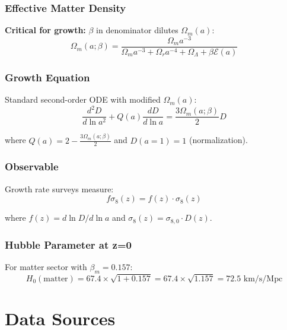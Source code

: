 \documentclass[11pt]{article}
\begin{document}
\subsubsection{Effective Matter Density}

\textbf{Critical for growth:} $\beta$ in denominator dilutes $\Omega_m(a)$:
\begin{equation}
\Omega_m(a; \beta) = \frac{\Omega_m a^{-3}}{\Omega_m a^{-3} + \Omega_r a^{-4} + \Omega_\Lambda + \beta \mathcal{E}(a)}
\end{equation}

\subsubsection{Growth Equation}

Standard second-order ODE with modified $\Omega_m(a)$:
\begin{equation}
\frac{d^2 D}{d\ln a^2} + Q(a) \frac{dD}{d\ln a} = \frac{3\Omega_m(a; \beta)}{2} D
\end{equation}

where $Q(a) = 2 - \frac{3\Omega_m(a; \beta)}{2}$ and $D(a=1) = 1$ (normalization).

\subsubsection{Observable}

Growth rate surveys measure:
\begin{equation}
f\sigma_8(z) = f(z) \cdot \sigma_8(z)
\end{equation}

where $f(z) = d \ln D / d \ln a$ and $\sigma_8(z) = \sigma_{8,0} \cdot D(z)$.

\subsubsection{Hubble Parameter at z=0}

For matter sector with $\beta_m = 0.157$:
\begin{equation}
H_0(\text{matter}) = 67.4 \times \sqrt{1 + 0.157} = 67.4 \times \sqrt{1.157} = 72.5 \text{ km/s/Mpc}
\end{equation}

\section{Data Sources}
\end{document}
